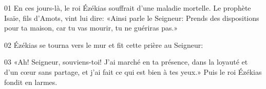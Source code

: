 01 En ces jours-là, le roi Ézékias souffrait d’une maladie mortelle. Le prophète Isaïe, fils d’Amots, vint lui dire: «Ainsi parle le Seigneur: Prends des dispositions pour ta maison, car tu vas mourir, tu ne guériras pas.»

02 Ézékias se tourna vers le mur et fit cette prière au Seigneur:

03 «Ah! Seigneur, souviens-toi! J’ai marché en ta présence, dans la loyauté et d’un cœur sans partage, et j’ai fait ce qui est bien à tes yeux.» Puis le roi Ézékias fondit en larmes.
